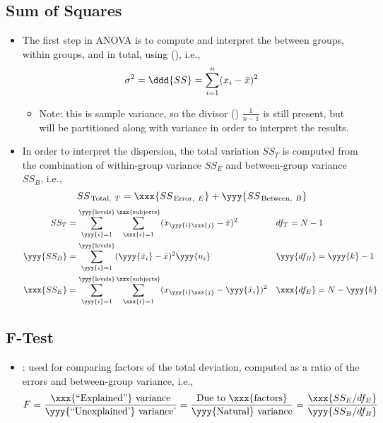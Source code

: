 \begin{itemize}
  \subsection{Sum of Squares}
  \begin{itemize}
    \item The first step in ANOVA is to compute and interpret the \hyperref[Subsection: Measures of Dispersion]{} between groups, within groups, and in total, using \hyperref[Subsection: Measures of Dispersion]{} (), i.e.,
    \[%
    \sigma^2 = \ddd{SS} = \sum_{i = 1}^{n}(x_i-\bar{x})^2
    \]%
    \begin{itemize}
      \item Note: this is sample variance, so the divisor (\hyperref[Subsection: Degrees of Freedom]{}) \(\frac{1}{n-1}\) is still present, but will be partitioned along with variance in order to interpret the results.
    \end{itemize}
    \item In order to interpret the dispersion, the total variation \(SS_T\) is computed from the combination of within-group variance \(SS_E\) and between-group variance \(SS_B\), i.e.,
    \[%
    SS_{\,\text{Total,}~T} = \xxx{SS_{\,\text{Error,}~E}} + \yyy{SS_{\,\text{Between,}~B}}
    \]%
    \begin{align*}
      SS_T &= \sum_{\yyy{i} = 1}^{\text{\yyy{\scriptsize{levels}}}}\sum_{\xxx{i} = 1}^{\text{\xxx{\scriptsize{subjects}}}}(x_{\yyy{i}\xxx{j}}-\bar{x})^2  &&
      df_T = N - 1\\
      \yyy{SS_B} &= \sum_{\yyy{i} = 1}^{\text{\yyy{\scriptsize{levels}}}}(\yyy{\bar{x}_i} - \bar{x})^2 \yyy{n_i} &&
      \yyy{df_B} = \yyy{k} - 1 \\
      \xxx{SS_E} &= \sum_{\yyy{i} = 1}^{\text{\yyy{\scriptsize{levels}}}}\sum_{\xxx{i} = 1}^{\text{\xxx{\scriptsize{subjects}}}}(x_{\yyy{i}\xxx{j}}-\yyy{\bar{x}_i})^2  &&
      \xxx{df_E} = N-\yyy{k} 
    \end{align*}
  \end{itemize}

  \subsection{F-Test}
  \begin{itemize}
    \item {}: used for comparing factors of the total deviation, computed as a ratio of the errors and between-group variance, i.e.,
    \[%
    F = \frac{\text{\xxx{``Explained''} variance}}{\text{\yyy{``Unexplained'} variance'}} = \frac{\text{Due to \xxx{factors}}}{\text{\yyy{Natural} variance}} = \frac{\xxx{SS_E / df_E}}{\yyy{SS_B/df_B}}
    \]%
    

\end{itemize}
\end{itemize}
